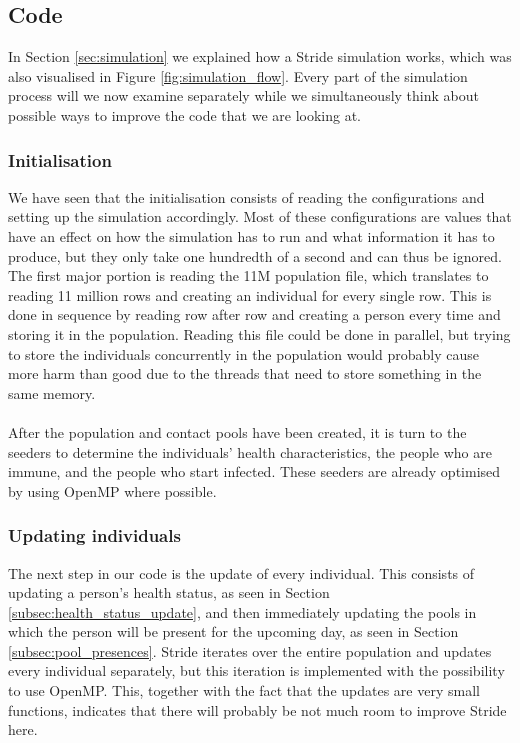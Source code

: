 \subsection{Code}
In Section \ref{sec:simulation} we explained how a Stride simulation works, which was also visualised in Figure \ref{fig:simulation_flow}. Every part of the simulation process will we now examine separately while we simultaneously think about possible ways to improve the code that we are looking at.

\subsubsection{Initialisation}
We have seen that the initialisation consists of reading the configurations and setting up the simulation accordingly. Most of these configurations are values that have an effect on how the simulation has to run and what information it has to produce, but they only take one hundredth of a second and can thus be ignored. The first major portion is reading the 11M population file, which translates to reading 11 million rows and creating an individual for every single row. This is done in sequence by reading row after row and creating a person every time and storing it in the population. Reading this file could be done in parallel, but trying to store the individuals concurrently in the population would probably cause more harm than good due to the threads that need to store something in the same memory.
\\\\
After the population and contact pools have been created, it is turn to the seeders to determine the individuals' health characteristics, the people who are immune, and the people who start infected. These seeders are already optimised by using OpenMP where possible.

\subsubsection{Updating individuals}
The next step in our code is the update of every individual. This consists of updating a person's health status, as seen in Section \ref{subsec:health_status_update}, and then immediately updating the pools in which the person will be present for the upcoming day, as seen in Section \ref{subsec:pool_presences}. Stride iterates over the entire population and updates every individual separately, but this iteration is implemented with the possibility to use OpenMP. This, together with the fact that the updates are very small functions, indicates that there will probably be not much room to improve Stride here.

